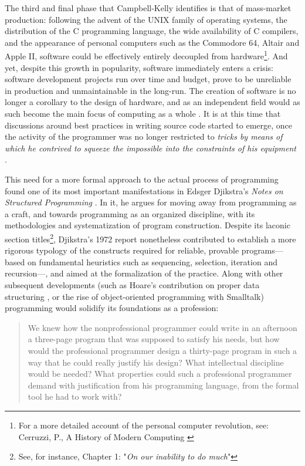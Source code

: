 The third and final phase that Campbell-Kelly identifies is that of mass-market production: following the advent of the UNIX family of operating systems, the distribution of the C programming language, the wide availability of C compilers, and the appearance of personal computers such as the Commodore 64, Altair and Apple II, software could be effectively entirely decoupled from hardware\footnote{For a more detailed account of the personal computer revolution, see: Cerruzzi, P., A History of Modern Computing \citep{ceruzzi_history_2003}}. And yet, despite this growth in popularity, software immediately enters a crisis: software development projects run over time and budget, prove to be unreliable in production and unmaintainable in the long-run. The creation of software is no longer a corollary to the design of hardware, and as an independent field would as such become the main focus of computing as a whole \citep{ceruzzi_history_2003}. It is at this time that discussions around best practices in writing source code started to emerge, once the activity of the programmer was no longer restricted to \emph{tricks by means of which he contrived to squeeze the impossible into the constraints of his equipment} \citep{dijkstra_humble_2007}.

This need for a more formal approach to the actual process of programming found one of its most important manifestations in Edsger Djikstra's \emph{Notes on Structured Programming} \citep{dijkstra_chapter_1972}. In it, he argues for moving away from programming as a craft, and towards programming as an organized discipline, with its methodologies and systematization of program construction. Despite its laconic section titles\footnote{See, for instance, Chapter 1: "\emph{On our inability to do much}"}, Djikstra's 1972 report nonetheless contributed to establish a more rigorous typology of the constructs required for reliable, provable programs—based on fundamental heuristics such as sequencing, selection, iteration and recursion—, and aimed at the formalization of the practice. Along with other subsequent developments (such as Hoare's contribution on proper data structuring \citep{hoare_chapter_1972}, or the rise of object-oriented programming with Smalltalk) programming would solidify its foundations as a profession:

\begin{quote}
  We knew how the nonprofessional programmer could write in an afternoon a three-page program that was supposed to satisfy his needs, but how would the professional programmer design a thirty-page program in such a way that he could really justify his design? What intellectual discipline would be needed? What properties could such a professional programmer demand with justification from his programming language, from the formal tool he had to work with?  \citep{dijkstra_chapter_1972}
\end{quote}

